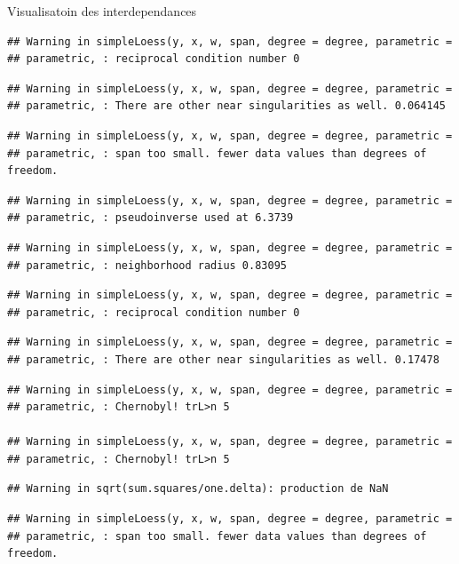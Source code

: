 \documentclass[11pt,ignorenonframetext,]{beamer}
\begin{document}
\begin{frame}[fragile]{Visualisatoin des interdependances}
\begin{verbatim}
## Warning in simpleLoess(y, x, w, span, degree = degree, parametric =
## parametric, : reciprocal condition number 0
\end{verbatim}

\begin{verbatim}
## Warning in simpleLoess(y, x, w, span, degree = degree, parametric =
## parametric, : There are other near singularities as well. 0.064145
\end{verbatim}

\begin{verbatim}
## Warning in simpleLoess(y, x, w, span, degree = degree, parametric =
## parametric, : span too small. fewer data values than degrees of freedom.
\end{verbatim}

\begin{verbatim}
## Warning in simpleLoess(y, x, w, span, degree = degree, parametric =
## parametric, : pseudoinverse used at 6.3739
\end{verbatim}

\begin{verbatim}
## Warning in simpleLoess(y, x, w, span, degree = degree, parametric =
## parametric, : neighborhood radius 0.83095
\end{verbatim}

\begin{verbatim}
## Warning in simpleLoess(y, x, w, span, degree = degree, parametric =
## parametric, : reciprocal condition number 0
\end{verbatim}

\begin{verbatim}
## Warning in simpleLoess(y, x, w, span, degree = degree, parametric =
## parametric, : There are other near singularities as well. 0.17478
\end{verbatim}

\begin{verbatim}
## Warning in simpleLoess(y, x, w, span, degree = degree, parametric =
## parametric, : Chernobyl! trL>n 5

## Warning in simpleLoess(y, x, w, span, degree = degree, parametric =
## parametric, : Chernobyl! trL>n 5
\end{verbatim}

\begin{verbatim}
## Warning in sqrt(sum.squares/one.delta): production de NaN
\end{verbatim}

\begin{verbatim}
## Warning in simpleLoess(y, x, w, span, degree = degree, parametric =
## parametric, : span too small. fewer data values than degrees of freedom.
\end{verbatim}


\end{frame}
\end{document}
